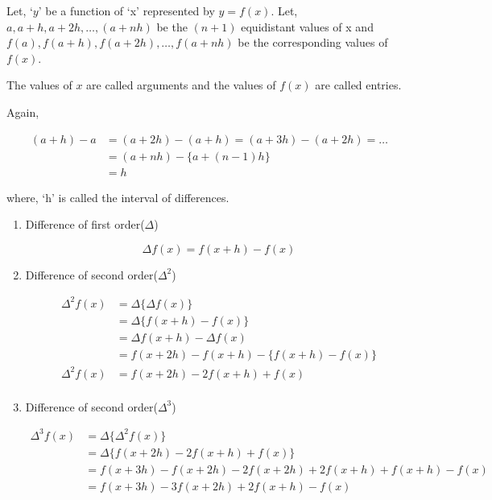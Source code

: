 \documentclass{article}
\begin{document}
              Let, `$y$' be a function of `x' represented by $y=f(x)$. Let, $a,a+h,a+2h,
              \dots,(a+nh)$ be the $(n+1)$ equidistant values of x and 
              $f(a),f(a+h),f(a+2h),\dots,f(a+nh)$ be the corresponding values of $f(x)$.
              
              The values of $x$ are called arguments and the values of $f(x)$ are called 
              entries.
              
              Again,

              \begin{align*}
                (a+h)-a&=(a+2h)-(a+h)=(a+3h)-(a+2h)=\dots\\
                &=(a+nh)-\{a+(n-1)h\}\\
                &=h
              \end{align*}

              where, `h' is called the interval of differences.

              \begin{enumerate}
                \item Difference of first order($\Delta$)
                  
                  \begin{equation*}
                    \Delta f(x)=f(x+h)-f(x)
                  \end{equation*}
                
                \item Difference of second order($\Delta^2$)
              
                  \begin{align*}
                    \Delta^2 f(x)&=\Delta \{\Delta f(x)\}\\
                    &=\Delta \{f(x+h)-f(x)\}\\
                    &=\Delta f(x+h)-\Delta f(x)\\
                    &=f(x+2h)-f(x+h)-\{f(x+h)-f(x)\}\\
                    \Delta^2f(x)&=f(x+2h)-2f(x+h)+f(x)\\
                  \end{align*}
              
                \item Difference of second order($\Delta^3$)
              
                  \begin{align*}
                    \Delta^3 f(x)&=\Delta \{\Delta^2 f(x)\}\\
                    &=\Delta \{f(x+2h)-2f(x+h)+f(x)\}\\
                    &=f(x+3h)-f(x+2h)-2f(x+2h)+2f(x+h)+f(x+h)-f(x)\\
                    &=f(x+3h)-3f(x+2h)+2f(x+h)-f(x)
                  \end{align*}
              
              \end{enumerate}
            
\end{document}
